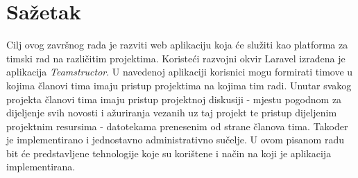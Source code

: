 \section*{Sažetak}
\label{sec:summary}
Cilj ovog završnog rada je razviti web aplikaciju koja će služiti kao platforma za timski rad na različitim projektima. Koristeći razvojni okvir Laravel izrađena je aplikacija \textit{Teamstructor}. U navedenoj aplikaciji korisnici mogu formirati timove u kojima članovi tima imaju pristup projektima na kojima tim radi. Unutar svakog projekta članovi tima imaju pristup projektnoj diskusiji - mjestu pogodnom za dijeljenje svih novosti i ažuriranja vezanih uz taj projekt te pristup dijeljenim projektnim resursima - datotekama prenesenim od strane članova tima. Također je implementirano i jednostavno administrativno sučelje. U ovom pisanom radu bit će predstavljene tehnologije koje su korištene i način na koji je aplikacija implementirana.
